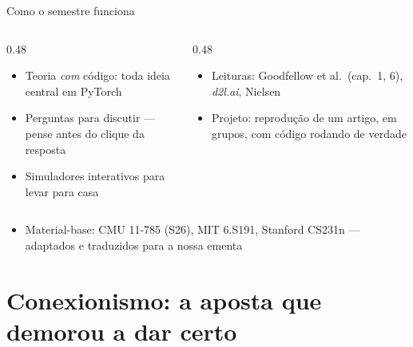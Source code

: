 \documentclass[aspectratio=169, 11pt]{beamer}
\begin{document}
\begin{frame}{Como o semestre funciona}
  \begin{columns}[T]
    \begin{column}{0.48\textwidth}
      \begin{tcolorbox}[iccaixa=icCiano, title={Em aula}]
        \begin{itemize}\setlength{\itemsep}{0.2ex}
          \item Teoria \emph{com} código: toda ideia central em PyTorch
          \item Perguntas para discutir — pense antes do clique da resposta
          \item Simuladores interativos para levar para casa
        \end{itemize}
      \end{tcolorbox}
    \end{column}
    \begin{column}{0.48\textwidth}
      \begin{tcolorbox}[iccaixa=icMagenta, title={Fora de aula}]
        \begin{itemize}\setlength{\itemsep}{0.2ex}
          \item Leituras: Goodfellow et al.\ (cap.\ 1, 6), \emph{d2l.ai},
                Nielsen
          \item Projeto: reprodução de um artigo, em grupos, com código
                rodando de verdade
        \end{itemize}
      \end{tcolorbox}
    \end{column}
  \end{columns}

  \medskip
  \begin{itemize}
    \item Material-base: CMU 11-785 (S26), MIT 6.S191, Stanford CS231n —
          adaptados e traduzidos para a nossa ementa
  \end{itemize}
\end{frame}

\section{Conexionismo: a aposta que demorou a dar certo}
\end{document}
